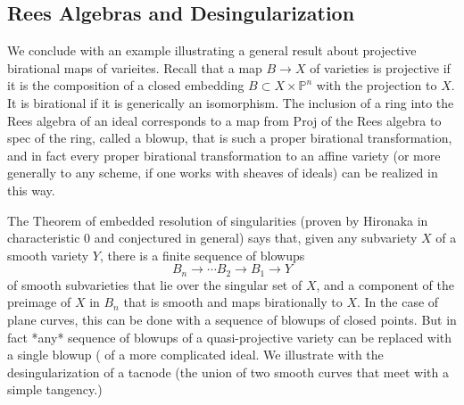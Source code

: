 \documentclass[twoside,12pt, leqno]{amsart}
\def\PP{{\mathbb P}}
\begin{document}
\begin{normalsize}
\section{Rees Algebras and Desingularization}

We conclude with an example illustrating a general result about projective birational maps of varieites.
Recall that a map $B\to X$ of varieties is projective if it is the composition of a closed embedding $B\subset X\times \PP^n$ with the projection to $X$.
It is birational if it is generically an isomorphism. The inclusion of a ring into the Rees algebra
of an ideal corresponds to a map from Proj of the Rees algebra to spec of the ring, called a blowup, that is such a proper birational transformation, and in fact every proper birational transformation to an affine variety (or more generally to any scheme, if one works with sheaves of ideals) can be realized in this way.

The Theorem of embedded resolution of singularities (proven by Hironaka in characteristic 0 and conjectured in general) says that, given any subvariety $X$ of a smooth variety $Y$, there is
a finite sequence of blowups 
$$
B_n \to \cdots B_2 \to B_1 \to Y
$$
of smooth subvarieties that lie over the singular set of $X$,  and a component of the preimage of
$X$ in $B_n$ that is smooth and maps birationally to $X$. In the case of plane curves, this can be done with a sequence of blowups of closed points. But in fact *any* sequence of blowups of a quasi-projective variety can be replaced with a single blowup (\cite[Theorem II.7.17]{H} of a more complicated ideal. We illustrate with the desingularization of a tacnode (the union of two smooth curves that meet with a simple tangency.)


\end{normalsize}
\end{document}
